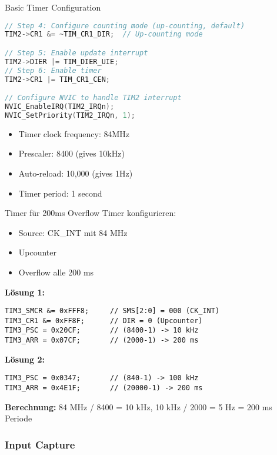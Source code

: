 \begin{example2}{Basic Timer Configuration}
\begin{lstlisting}[language=C, style=basesmol]
// Step 4: Configure counting mode (up-counting, default)
TIM2->CR1 &= ~TIM_CR1_DIR;  // Up-counting mode

// Step 5: Enable update interrupt
TIM2->DIER |= TIM_DIER_UIE;
// Step 6: Enable timer
TIM2->CR1 |= TIM_CR1_CEN;

// Configure NVIC to handle TIM2 interrupt
NVIC_EnableIRQ(TIM2_IRQn);
NVIC_SetPriority(TIM2_IRQn, 1);
\end{lstlisting}

\begin{itemize}
    \item Timer clock frequency: 84MHz
    \item Prescaler: 8400 (gives 10kHz)
    \item Auto-reload: 10,000 (gives 1Hz)
    \item Timer period: 1 second
\end{itemize}
\end{example2}


\begin{example2}{Timer für 200ms Overflow}
    Timer konfigurieren:
    \begin{itemize}
        \item Source: CK\_INT mit 84 MHz
        \item Upcounter
        \item Overflow alle 200 ms
    \end{itemize}
    
    \textbf{Lösung 1:}
\begin{lstlisting}[style=basesmol]
TIM3_SMCR &= 0xFFF8;     // SMS[2:0] = 000 (CK_INT)
TIM3_CR1 &= 0xFF8F;      // DIR = 0 (Upcounter)
TIM3_PSC = 0x20CF;       // (8400-1) -> 10 kHz
TIM3_ARR = 0x07CF;       // (2000-1) -> 200 ms
\end{lstlisting}
    
    \textbf{Lösung 2:}
\begin{lstlisting}[style=basesmol]
TIM3_PSC = 0x0347;       // (840-1) -> 100 kHz
TIM3_ARR = 0x4E1F;       // (20000-1) -> 200 ms
\end{lstlisting}
    
    \textbf{Berechnung:}
    84 MHz / 8400 = 10 kHz, 10 kHz / 2000 = 5 Hz = 200 ms Periode
\end{example2}

\subsubsection{Input Capture}



